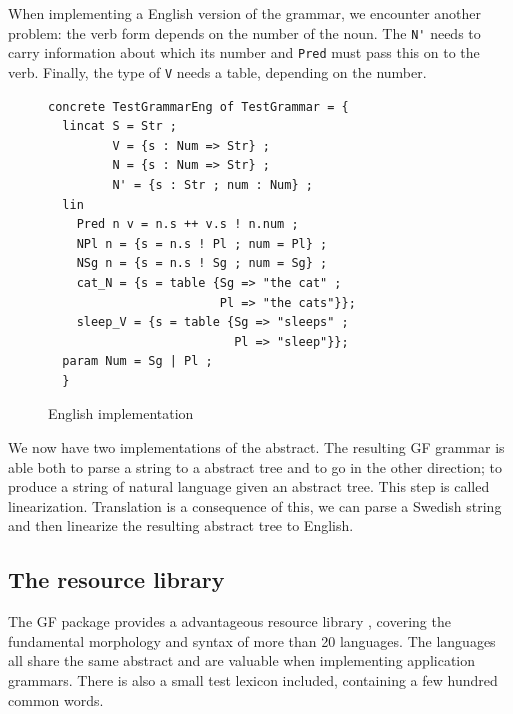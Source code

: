 \documentclass{report}
\begin{document}
When implementing a English version of the grammar, we encounter another
problem: the verb form depends on the number of the noun. The \verb|N'| needs to carry
information about which its number and \verb|Pred| must pass this on to the
verb. Finally, the type of \verb|V| needs a table, depending on the number.
\begin{figure}[h!]
\begin{verbatim}              
concrete TestGrammarEng of TestGrammar = {
  lincat S = Str ;
         V = {s : Num => Str} ;
         N = {s : Num => Str} ;
         N' = {s : Str ; num : Num} ;
  lin   
    Pred n v = n.s ++ v.s ! n.num ;
    NPl n = {s = n.s ! Pl ; num = Pl} ;
    NSg n = {s = n.s ! Sg ; num = Sg} ;
    cat_N = {s = table {Sg => "the cat" ;
                        Pl => "the cats"}};
    sleep_V = {s = table {Sg => "sleeps" ; 
                          Pl => "sleep"}};
  param Num = Sg | Pl ;
  }
\end{verbatim}           
\caption{English implementation}
\label{fig:gfTestEng}
\end{figure}


We now have two implementations of the abstract. The resulting GF grammar is able both to
parse a string to a abstract tree and to go in the other direction; to produce
a string of natural language given an abstract tree. This step is called linearization.
Translation is a consequence of this, we can parse a Swedish string and then 
linearize the resulting abstract tree to English. 

\subsection{The resource library}
\label{sec:resources}
The GF package provides a advantageous resource library \cite{gf-resource}, covering the
fundamental morphology and syntax of more than 20 languages.
The languages all share the same abstract and are valuable
when implementing application grammars. There is also a small test lexicon
included, containing a few hundred common words.
\end{document}

